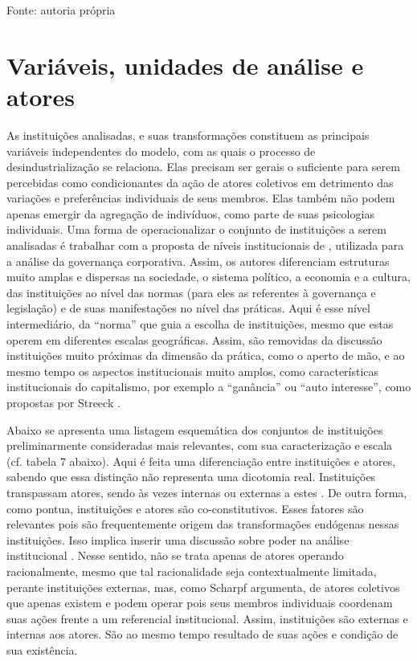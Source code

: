 \begin{table}[htbp]
\centering
\caption{Indicadores de desindustrialização na literatura}
\label{tab:cap03-indicadores-literatura}
\end{table}

Fonte: autoria própria

\section{Variáveis, unidades de análise e atores}\label{variuxe1veis-unidades-de-anuxe1lise-e-atores}

As instituições analisadas, e suas transformações constituem as
principais variáveis independentes do modelo, com as quais o processo
de desindustrialização se relaciona. Elas precisam ser gerais o
suficiente para serem percebidas como condicionantes da ação de atores
coletivos em detrimento das variações e preferências individuais de
seus membros. Elas também não podem apenas emergir da agregação de
indivíduos, como parte de suas psicologias individuais. Uma forma de
operacionalizar o conjunto de instituições a serem analisadas é
trabalhar com a proposta de níveis institucionais de , utilizada para a análise da governança corporativa.
Assim, os autores diferenciam estruturas muito amplas e dispersas na
sociedade, o sistema político, a economia e a cultura, das instituições
ao nível das normas (para eles as referentes à governança e legislação)
e de suas manifestações no nível das práticas. Aqui é esse nível
intermediário, da ``norma'' que guia a escolha de instituições, mesmo
que estas operem em diferentes escalas geográficas. Assim, são
removidas da discussão instituições muito próximas da dimensão da
prática, como o aperto de mão, e ao mesmo tempo os aspectos
institucionais muito amplos, como características institucionais do
capitalismo, por exemplo a ``ganância'' ou ``auto interesse'', como
propostas por Streeck .

Abaixo se apresenta uma listagem esquemática dos conjuntos de
instituições preliminarmente consideradas mais relevantes, com sua
caracterização e escala (cf. tabela 7 abaixo). Aqui é feita uma
diferenciação entre instituições e atores, sabendo que essa distinção
não representa uma dicotomia real. Instituições transpassam atores,
sendo às vezes internas ou externas a estes . De
outra forma, como \citet{jackson_actors_2010} pontua, instituições e
atores são co-constitutivos. Esses fatores são relevantes pois são
frequentemente origem das transformações endógenas nessas instituições.
Isso implica inserir uma discussão sobre poder na análise institucional
. Nesse sentido, não se trata apenas de atores
operando racionalmente, mesmo que tal racionalidade seja contextualmente
limitada, perante instituições externas, mas, como Scharpf
 argumenta, de atores coletivos que apenas existem
e podem operar pois seus membros individuais coordenam suas ações
frente a um referencial institucional. Assim, instituições são externas
e internas aos atores. São ao mesmo tempo resultado de suas ações e
condição de sua existência.

